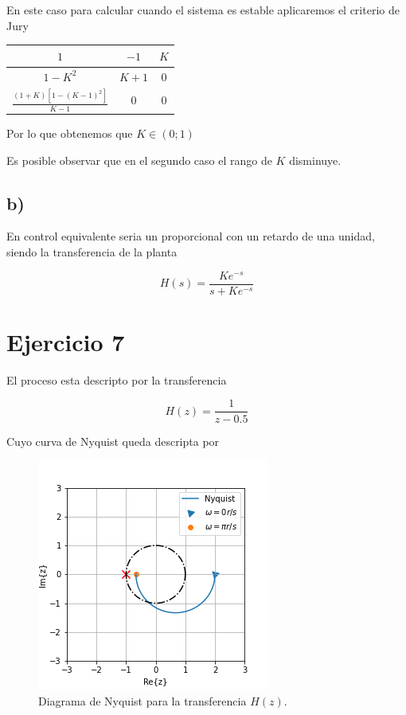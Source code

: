 \documentclass{article}
\begin{document}
                    En este caso para calcular cuando el sistema es estable aplicaremos el criterio de Jury

                    \begin{table}[H]
                        \centering
                        \begin{tabular}{|c|c|c|}
                            \hline $1$ & $-1$ & $K$ \\
                            \hline $1-K^2$ & $K+1$ & 0 \\
                            \hline $\frac{(1+K)[ 1 - (K-1)^2 ]}{K-1}$ & 0 & 0\\
                            \hline
                        \end{tabular}
                    \end{table}

                    Por lo que obtenemos que $K \in (0;1)$


                Es posible observar que en el segundo caso el rango de $K$ disminuye.

            \subsection{b)}

                En control equivalente seria un proporcional con un retardo de una unidad, siendo la transferencia de la planta 

                \begin{equation}
                    H(s) = \frac{Ke^{-s}}{s + Ke^{-s}}
                \end{equation}

    \section{Ejercicio 7}

            El proceso esta descripto por la transferencia 

            \begin{equation}
                H(z) = \frac{1}{z-0.5}
            \end{equation}

            Cuyo curva de Nyquist queda descripta por 

            \begin{figure}[H]
                \centering
                \includegraphics[width=.4\textwidth]{Img/7.png}
                \caption{Diagrama de Nyquist para la transferencia $H(z)$.}
                \label{}
            \end{figure}
\end{document}
